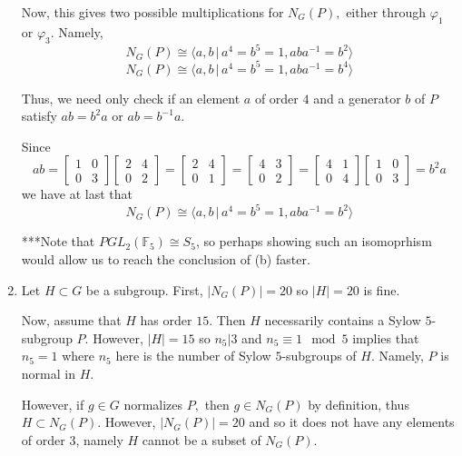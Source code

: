 \documentclass[12pt]{AlgebraQual}
\begin{document}
\begin{solution}
\begin{enumerate}[label=(\alph*)]
    Now, this gives two possible multiplications for $N_G(P),$ either through $\varphi_1$ or $\varphi_3$. Namely, $$N_G(P)\cong\langle a,b\,|\,a^4=b^5=1,aba^{-1}=b^2\rangle$$ $$N_G(P)\cong\langle a,b\,|\,a^4=b^5=1,aba^{-1}=b^4\rangle$$

    Thus, we need only check if an element $a$ of order $4$ and a generator $b$ of $P$ satisfy $ab=b^2a$ or $ab=b^{-1}a$.

    Since $$ab=\begin{bmatrix}
    1 & 0\\
    0 & 3
    \end{bmatrix}\begin{bmatrix}
    2 & 4\\
    0 & 2
    \end{bmatrix}=\begin{bmatrix}
    2 & 4\\
    0 & 1
    \end{bmatrix}=\begin{bmatrix}
    4 & 3\\
    0 & 2
    \end{bmatrix}=\begin{bmatrix}
    4 & 1\\
    0 & 4
    \end{bmatrix}\begin{bmatrix}
    1 & 0\\
    0 & 3
    \end{bmatrix}=b^2a$$ we have at last that $$N_G(P)\cong\langle a,b\,|\,a^4=b^5=1,aba^{-1}=b^2\rangle$$

    \begin{mybox}
    ***Note that $PGL_2(\mathbb{F}_5)\cong S_5$, so perhaps showing such an isomoprhism would allow us to reach the conclusion of (b) faster.
\end{mybox}

    \item

     Let $H\subset G$ be a subgroup. First, $|N_G(P)|=20$ so $|H|=20$ is fine.

     Now, assume that $H$ has order $15.$ Then $H$ necessarily contains a Sylow $5$-subgroup $P.$ However, $|H|=15$ so $n_5|3$ and $n_5\equiv 1\mod 5$ implies that $n_5=1$ where $n_5$ here is the number of Sylow $5$-subgroups of $H.$ Namely, $P$ is normal in $H.$

    However, if $g\in G$ normalizes $P,$ then $g\in N_G(P)$ by definition, thus $H\subset N_G(P).$ However, $|N_G(P)|=20$ and so it does not have any elements of order $3$, namely $H$ cannot be a subset of $N_G(P).$


\end{enumerate}
\end{solution}
\end{document}
